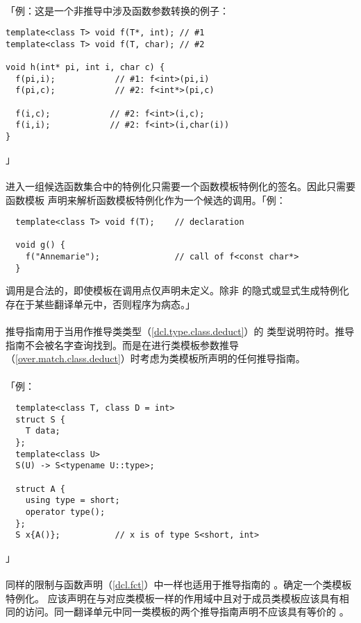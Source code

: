 \paragraph{}
「例：这是一个非推导中涉及函数参数转换的例子：
\begin{lstlisting}
template<class T> void f(T*, int); // #1
template<class T> void f(T, char); // #2

void h(int* pi, int i, char c) {
  f(pi,i);            // #1: f<int>(pi,i)
  f(pi,c);            // #2: f<int*>(pi,c)

  f(i,c);            // #2: f<int>(i,c);
  f(i,i);            // #2: f<int>(i,char(i))
}
\end{lstlisting}」

\paragraph{}
进入一组候选函数集合中的特例化只需要一个函数模板特例化的签名。因此只需要函数模板
声明来解析函数模板特例化作为一个候选的调用。「例：
\begin{lstlisting}
  template<class T> void f(T);    // declaration

  void g() {
    f("Annemarie");               // call of f<const char*>
  }
\end{lstlisting}
调用是合法的，即使模板在调用点仅声明未定义。除非
的隐式或显式生成特例化存在于某些翻译单元中，否则程序为病态。」

\paragraph{}
推导指南用于当用作推导类类型（\ref{dcl.type.class.deduct}）的
类型说明符时。推导指南不会被名字查询找到。而是在进行类模板参数推导
（\ref{over.match.class.deduct}）时考虑为类模板所声明的任何推导指南。


\paragraph{}
「例：
\begin{lstlisting}
  template<class T, class D = int>
  struct S {
    T data;
  };
  template<class U>
  S(U) -> S<typename U::type>;

  struct A {
    using type = short;
    operator type();
  };
  S x{A()};           // x is of type S<short, int>
\end{lstlisting}」

\paragraph{}
同样的限制与函数声明（\ref{dcl.fct}）中一样也适用于推导指南的
。确定一个类模板特例化。
应该声明在与对应类模板一样的作用域中且对于成员类模板应该具有相
同的访问。同一翻译单元中同一类模板的两个推导指南声明不应该具有等价的
。
